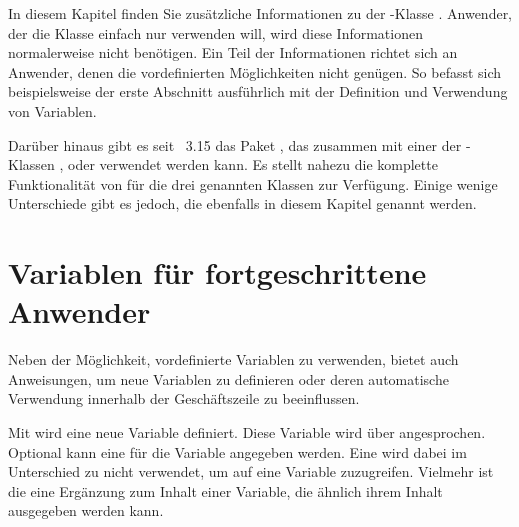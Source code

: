 \BeginIndexGroup%
%
In diesem Kapitel finden Sie zusätzliche Informationen zu der
\KOMAScript-Klasse . %
Anwender, der die Klasse einfach nur verwenden will, wird diese Informationen
normalerweise nicht benötigen. Ein Teil der Informationen richtet sich an
Anwender, denen die vordefinierten Möglichkeiten nicht genügen. So
befasst sich beispielsweise der erste Abschnitt ausführlich mit der Definition
und Verwendung von Variablen.%
\iffalse%
\ Darüber hinaus finden sich in diesem Kapitel auch Informationen über
Möglichkeiten, die aus Gründen der Verbesserung der Kompatibilität zur
obsoleten \KOMAScript-Klasse \Class{scrlettr} geschaffen wurden. Es wird auch
ausführlich erklärt, wie man einen Brief dieser veralteten Klasse auf die
aktuelle Briefklasse übertragen kann.  \fi

%
Darüber hinaus gibt es seit
\KOMAScript~3.15 das Paket
, das zusammen mit einer der
\KOMAScript-Klassen ,  oder 
verwendet werden kann. Es stellt nahezu die komplette Funktionalität von
 für die drei genannten Klassen zur Verfügung. Einige wenige
Unterschiede gibt es jedoch, die ebenfalls in diesem Kapitel genannt werden.%


\section{Variablen für fortgeschrittene Anwender}
\BeginIndexGroup
{}

Neben der Möglichkeit, vordefinierte Variablen zu verwenden, bietet
\KOMAScript{} auch Anweisungen, um neue Variablen zu definieren oder deren
automatische Verwendung innerhalb der Geschäftszeile zu beeinflussen.


\begin{Declaration}
\end{Declaration}
Mit  wird eine neue Variable definiert. Diese Variable wird
über  angesprochen. Optional kann eine  für die
Variable  angegeben werden. Eine  wird dabei im
Unterschied zu  nicht verwendet, um auf eine Variable
zuzugreifen. Vielmehr ist die  eine Ergänzung zum Inhalt
einer Variable, die ähnlich ihrem Inhalt ausgegeben werden kann. 

